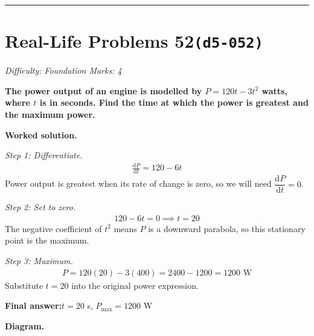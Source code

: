 \documentclass[11pt]{article}
\newcommand{\question}[1]{\par\medskip\noindent\textbf{#1}\par}
\begin{document}
\medskip\hrule

\section*{Real-Life Problems 52\quad\small\texttt{(d5-052)}}
\textit{Difficulty: Foundation \quad\textbar\quad Marks: 4}

\question{The power output of an engine is modelled by \( P = 120t - 3t^2 \) watts, where \( t \) is in seconds. Find the time at which the power is greatest and the maximum power.}

\textbf{Worked solution.}

\textit{Step 1: Differentiate.}
\[\begin{gathered}
\frac{\mathrm{d}P}{\mathrm{d}t} = 120 - 6t
\end{gathered}\]
Power output is greatest when its rate of change is zero, so we will need \( \dfrac{\mathrm{d}P}{\mathrm{d}t} = 0 \).

\textit{Step 2: Set to zero.}
\[\begin{gathered}
120 - 6t = 0 \implies t = 20
\end{gathered}\]
The negative coefficient of \( t^2 \) means \( P \) is a downward parabola, so this stationary point is the maximum.

\textit{Step 3: Maximum.}
\[\begin{gathered}
P = 120(20) - 3(400) = 2400 - 1200 = 1200 \text{ W}
\end{gathered}\]
Substitute \( t = 20 \) into the original power expression.

\begin{answerbox}
\textbf{Final answer:}\quad \(\displaystyle  t = 20 \) s, \(\displaystyle  P_{\max} = 1200 \) W
\end{answerbox}
\textbf{Diagram.}
\end{document}
